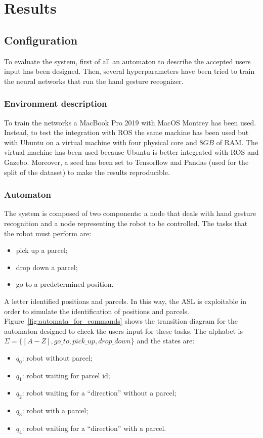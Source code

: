 \documentclass[../thesis.tex]{subfiles}
\begin{document}
\chapter{Results}\label{cap:results}
\section{Configuration}
To evaluate the system, first of all an automaton to describe the accepted users input has been designed. Then, several hyperparameters have been tried to train the neural networks that run the hand gesture recognizer.

\subsection{Environment description}
To train the networks a MacBook Pro 2019 with MacOS Montrey has been used. Instead, to test the integration with ROS the same machine has been used but with Ubuntu on a virtual machine with four physical core and $8GB$ of RAM. The virtual machine has been used because Ubuntu is better integrated with \acrshort{ROS} and Gazebo. Moreover, a seed has been set to Tensorflow and Pandas (used for the split of the dataset) to make the results reproducible.

\subsection{Automaton}\label{ss:automaton_description}
The system is composed of two components: a node that deals with  hand gesture recognition and a node representing the robot to be controlled. The tasks that the robot must perform are:
\begin{itemize}
    \item pick up a parcel;
    \item drop down a parcel;
    \item go to a predetermined position.
\end{itemize}
A letter identified positions and parcels. In this way, the \gls{ASL} is exploitable in order to simulate the identification of positions and parcels.\\
Figure~\ref{fig:automata_for_commands} shows the transition diagram for the automaton designed to check the users input for these tasks. The alphabet is $\Sigma = \{[A-Z], go\_to, pick\_up, drop\_down\}$ and the states are:
\begin{itemize}
    \item \textbf{$q_0$}: robot without parcel; 
    \item \textbf{$q_1$}: robot waiting for parcel id; 
    \item \textbf{$q_2$}: robot waiting for a ``direction'' without a parcel;
    \item \textbf{$q_3$}: robot with a parcel;
    \item \textbf{$q_4$}: robot waiting for a ``direction'' with a parcel.
\end{itemize}
\end{document}
